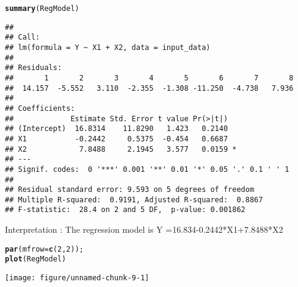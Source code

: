 \documentclass{article}\usepackage[]{graphicx}\usepackage[]{xcolor}
\makeatletter
\def\maxwidth{ %
  \ifdim\Gin@nat@width>\linewidth
    \linewidth
  \else
    \Gin@nat@width
  \fi
}
\newcommand{\hlnum}[1]{\textcolor[rgb]{0.686,0.059,0.569}{#1}}%
\newcommand{\hldef}[1]{\textcolor[rgb]{0.345,0.345,0.345}{#1}}%
\newcommand{\hlkwc}[1]{\textcolor[rgb]{0.333,0.667,0.333}{#1}}%
\newcommand{\hlkwd}[1]{\textcolor[rgb]{0.737,0.353,0.396}{\textbf{#1}}}%
\newenvironment{kframe}{%
 \def\at@end@of@kframe{}%
 \ifinner\ifhmode%
  \def\at@end@of@kframe{\end{minipage}}%
  \begin{minipage}{\columnwidth}%
 \fi\fi%
 \def\FrameCommand##1{\hskip\@totalleftmargin \hskip-\fboxsep
 \colorbox{shadecolor}{##1}\hskip-\fboxsep
     \hskip-\linewidth \hskip-\@totalleftmargin \hskip\columnwidth}%
 \MakeFramed {\advance\hsize-\width
   \@totalleftmargin\z@ \linewidth\hsize
   \@setminipage}}%
 {\par\unskip\endMakeFramed%
 \at@end@of@kframe}
\newenvironment{knitrout}{}{} %
\makeatother
\begin{document}
\begin{knitrout}
\color{fgcolor}\begin{kframe}
\begin{alltt}
\hlkwd{summary}\hldef{(RegModel)}
\end{alltt}
\begin{verbatim}
## 
## Call:
## lm(formula = Y ~ X1 + X2, data = input_data)
## 
## Residuals:
##       1       2       3       4       5       6       7       8 
##  14.157  -5.552   3.110  -2.355  -1.308 -11.250  -4.738   7.936 
## 
## Coefficients:
##             Estimate Std. Error t value Pr(>|t|)  
## (Intercept)  16.8314    11.8290   1.423   0.2140  
## X1           -0.2442     0.5375  -0.454   0.6687  
## X2            7.8488     2.1945   3.577   0.0159 *
## ---
## Signif. codes:  0 '***' 0.001 '**' 0.01 '*' 0.05 '.' 0.1 ' ' 1
## 
## Residual standard error: 9.593 on 5 degrees of freedom
## Multiple R-squared:  0.9191,	Adjusted R-squared:  0.8867 
## F-statistic:  28.4 on 2 and 5 DF,  p-value: 0.001862
\end{verbatim}
\end{kframe}
\end{knitrout}
Interpretation :
The regression model is
Y =16.834-0.2442*X1+7.8488*X2
\begin{knitrout}
\color{fgcolor}\begin{kframe}
\begin{alltt}
\hlkwd{par}\hldef{(}\hlkwc{mfrow}\hldef{=}\hlkwd{c}\hldef{(}\hlnum{2}\hldef{,}\hlnum{2}\hldef{));}
\hlkwd{plot}\hldef{(RegModel)}
\end{alltt}
\end{kframe}
\texttt{[image: figure/unnamed-chunk-9-1]} 
\end{knitrout}
\end{document}
